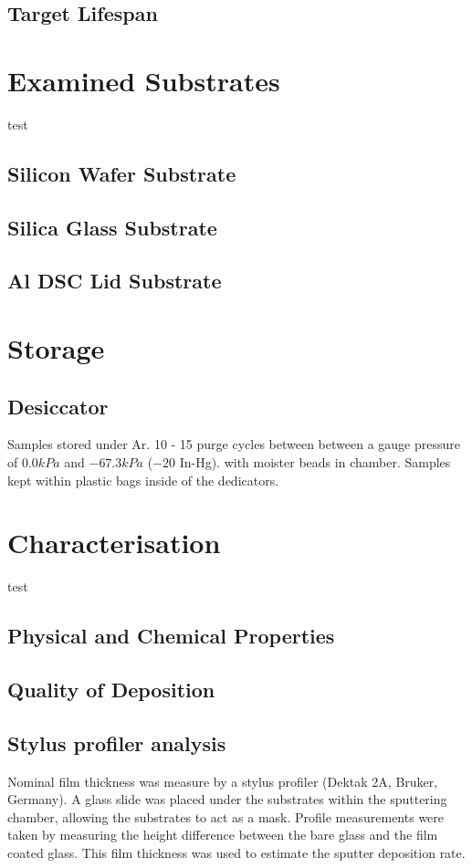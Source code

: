 \documentclass[a4paper,12pt,oneside]{report}%
\begin{document}
\subsection{Target Lifespan}

\section{Examined Substrates} 
test
\subsection{Silicon Wafer Substrate}

\subsection{Silica Glass Substrate}

\subsection{Al DSC Lid Substrate}

\section{Storage}

\subsection{Desiccator}
Samples stored under Ar. 
10 - 15 purge cycles between between a gauge pressure of $0.0 kPa$ and $-67.3 kPa$ ($-20$ In-Hg).
with moister beads in chamber. 
Samples kept within plastic bags inside of the dedicators. 

\section{Characterisation}
test
\subsection{Physical and Chemical Properties}

\subsection{Quality of Deposition} 
 
\subsection{Stylus profiler analysis}
Nominal film thickness was measure by a stylus profiler (Dektak 2A, Bruker, Germany). A glass slide was placed under the substrates within the sputtering chamber, allowing the substrates to act as a mask. Profile measurements were taken by measuring the height difference between the bare glass and the film coated glass. This film thickness was used to estimate the sputter deposition rate.  
\end{document}
